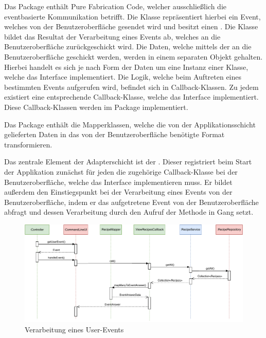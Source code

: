 Das Package \href{https://github.com/anditru/quickie/tree/bb41442c7f1ffbfcd3117cd86a40f7932e543a33/1-quickie-adapters/src/main/java/org/pinkcrazyunicorn/quickie/adapters/event}{} enthält Pure Fabrication Code, welcher ausschließlich die eventbasierte Kommunikation betrifft. Die Klasse  repräsentiert hierbei ein Event, welches von der Benutzeroberfläche gesendet wird und besitzt einen . Die Klasse  bildet das Resultat der Verarbeitung eines Events ab, welches an die Benutzeroberfläche zurückgeschickt wird. Die Daten, welche mittels der  an die Benutzeroberfläche geschickt werden, werden in einem separaten Objekt gehalten. Hierbei handelt es sich je nach Form der Daten um eine Instanz einer Klasse, welche das Interface  implementiert. Die Logik, welche beim Auftreten eines bestimmten Events aufgerufen wird, befindet sich in Callback-Klassen. Zu jedem  existiert eine entsprechende Callback-Klasse, welche das Interface  implementiert. Diese Callback-Klassen werden im Package \href{https://github.com/anditru/quickie/tree/bb41442c7f1ffbfcd3117cd86a40f7932e543a33/1-quickie-adapters/src/main/java/org/pinkcrazyunicorn/quickie/adapters/callbacks}{} implementiert.

Das Package \href{https://github.com/anditru/quickie/tree/bb41442c7f1ffbfcd3117cd86a40f7932e543a33/1-quickie-adapters/src/main/java/org/pinkcrazyunicorn/quickie/adapters/mappers}{} enthält die Mapperklassen, welche die von der Applikationsschicht gelieferten Daten in das von der Benutzeroberfläche benötigte Format transformieren.

Das zentrale Element der Adapterschicht ist der \href{https://github.com/anditru/quickie/blob/bb41442c7f1ffbfcd3117cd86a40f7932e543a33/1-quickie-adapters/src/main/java/org/pinkcrazyunicorn/quickie/adapters/Controller.java}{}. Dieser registriert beim Start der Applikation zunächst für jeden  die zugehörige Callback-Klasse bei der Benutzeroberfläche, welche das Interface  implementieren muss. Er bildet außerdem den Einstiegspunkt bei der Verarbeitung eines Events von der Benutzeroberfläche, indem er das aufgetretene Event von der Benutzeroberfläche abfragt und dessen Verarbeitung durch den Aufruf der Methode  in Gang setzt.

\begin{figure}[ht!]
    \includegraphics[width=0.98\columnwidth]{../diagrams/adapter_sequence.pdf}
    \caption{Verarbeitung eines User-Events}
    \label{fig:squence-diag-adapter}
\end{figure}

